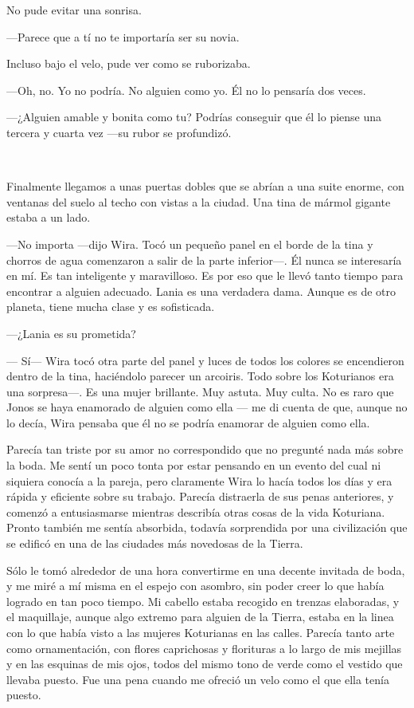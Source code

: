 No pude evitar una sonrisa.

---Parece que a tí no te importaría ser su novia.

Incluso bajo el velo, pude ver como se ruborizaba.

---Oh, no. Yo no podría. No alguien como yo. Él no lo pensaría dos
veces.

---¿Alguien amable y bonita como tu? Podrías conseguir que él lo piense
una tercera y cuarta vez ---su rubor se profundizó.

~

Finalmente llegamos a unas puertas dobles que se abrían a una suite
enorme, con ventanas del suelo al techo con vistas a la ciudad. Una tina
de mármol gigante estaba a un lado.

---No importa ---dijo Wira. Tocó un pequeño panel en el borde de la tina
y chorros de agua comenzaron a salir de la parte inferior---. Él nunca
se interesaría en mí. Es tan inteligente y maravilloso. Es por eso que
le llevó tanto tiempo para encontrar a alguien adecuado. Lania es una
verdadera dama. Aunque es de otro planeta, tiene mucha clase y es
sofisticada.

---¿Lania es su prometida?

--- Sí--- Wira tocó otra parte del panel y luces de todos los colores se
encendieron dentro de la tina, haciéndolo parecer un arcoiris. Todo
sobre los Koturianos era una sorpresa---. Es una mujer brillante. Muy
astuta. Muy culta. No es raro que Jonos se haya enamorado de alguien
como ella --- me di cuenta de que, aunque no lo decía, Wira pensaba que
él no se podría enamorar de alguien como ella.

Parecía tan triste por su amor no correspondido que no pregunté nada más
sobre la boda. Me sentí un poco tonta por estar pensando en un evento
del cual ni siquiera conocía a la pareja, pero claramente Wira lo hacía
todos los días y era rápida y eficiente sobre su trabajo. Parecía
distraerla de sus penas anteriores, y comenzó a entusiasmarse mientras
describía otras cosas de la vida Koturiana. Pronto también me sentía
absorbida, todavía sorprendida por una civilización que se edificó en
una de las ciudades más novedosas de la Tierra.

Sólo le tomó alrededor de una hora convertirme en una decente invitada
de boda, y me miré a mí misma en el espejo con asombro, sin poder creer
lo que había logrado en tan poco tiempo. Mi cabello estaba recogido en
trenzas elaboradas, y el maquillaje, aunque algo extremo para alguien de
la Tierra, estaba en la linea con lo que había visto a las mujeres
Koturianas en las calles. Parecía tanto arte como ornamentación, con
flores caprichosas y florituras a lo largo de mis mejillas y en las
esquinas de mis ojos, todos del mismo tono de verde como el vestido que
llevaba puesto. Fue una pena cuando me ofreció un velo como el que ella
tenía puesto.

